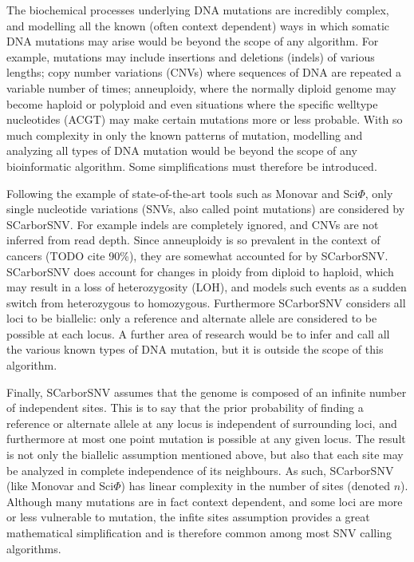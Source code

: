 \documentclass[../../main.tex]{subfiles}
\begin{document}
The biochemical processes underlying DNA mutations are incredibly complex, and modelling all the known (often context dependent) ways in which somatic DNA mutations may arise would be beyond the scope of any algorithm.
For example, mutations may include insertions and deletions (indels) of various lengths; copy number variations (CNVs) where sequences of DNA are repeated a variable number of times; anneuploidy, where the normally diploid genome may become haploid or polyploid and even situations where the specific welltype nucleotides (ACGT) may make certain mutations more or less probable.
With so much complexity in only the known patterns of mutation, modelling and analyzing all types of DNA mutation would be beyond the scope of any bioinformatic algorithm.
Some simplifications must therefore be introduced.

Following the example of state-of-the-art tools such as Monovar and Sci$\Phi$, only single nucleotide variations (SNVs, also called point mutations) are considered by SCarborSNV.
For example indels are completely ignored, and CNVs are not inferred from read depth.
Since anneuploidy is so prevalent in the context of cancers (TODO cite 90\%), they are somewhat accounted for by SCarborSNV.
SCarborSNV does account for changes in ploidy from diploid to haploid, which may result in a loss of heterozygosity (LOH), and models such events as a sudden switch from heterozygous to homozygous.
Furthermore SCarborSNV considers all loci to be biallelic: only a reference and alternate allele are considered to be possible at each locus.
A further area of research would be to infer and call all the various known types of DNA mutation, but it is outside the scope of this algorithm.

Finally, SCarborSNV assumes that the genome is composed of an infinite number of independent sites.
This is to say that the prior probability of finding a reference or alternate allele at any locus is independent of surrounding loci, and furthermore at most one point mutation is possible at any given locus.
The result is not only the biallelic assumption mentioned above, but also that each site may be analyzed in complete independence of its neighbours.
As such, SCarborSNV (like Monovar and Sci$\Phi$) has linear complexity in the number of sites (denoted $n$).
Although many mutations are in fact context dependent, and some loci are more or less vulnerable to mutation, the infite sites assumption provides a great mathematical simplification and is therefore common among most SNV calling algorithms.
\end{document}
